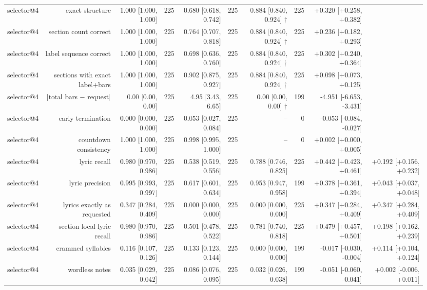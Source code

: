 \begin{table}[t]
\begin{tabular}{lrrrrrrrrr}
selector@4 & exact structure & 1.000 [1.000, 1.000] & 225 & 0.680 [0.618, 0.742] & 225 & 0.884 [0.840, 0.924] † & 225 & +0.320 [+0.258, +0.382] &  \\
selector@4 & section count correct & 1.000 [1.000, 1.000] & 225 & 0.764 [0.707, 0.818] & 225 & 0.884 [0.840, 0.924] † & 225 & +0.236 [+0.182, +0.293] &  \\
selector@4 & label sequence correct & 1.000 [1.000, 1.000] & 225 & 0.698 [0.636, 0.760] & 225 & 0.884 [0.840, 0.924] † & 225 & +0.302 [+0.240, +0.364] &  \\
selector@4 & sections with exact label+bars & 1.000 [1.000, 1.000] & 225 & 0.902 [0.875, 0.927] & 225 & 0.884 [0.840, 0.924] † & 225 & +0.098 [+0.073, +0.125] &  \\
selector@4 & |total bars $-$ request| & 0.00 [0.00, 0.00] & 225 & 4.95 [3.43, 6.65] & 225 & 0.00 [0.00, 0.00] † & 199 & -4.951 [-6.653, -3.431] &  \\
selector@4 & early termination & 0.000 [0.000, 0.000] & 225 & 0.053 [0.027, 0.084] & 225 & – & 0 & -0.053 [-0.084, -0.027] &  \\
selector@4 & countdown consistency & 1.000 [1.000, 1.000] & 225 & 0.998 [0.995, 1.000] & 225 & – & 0 & +0.002 [+0.000, +0.005] &  \\
selector@4 & lyric recall & 0.980 [0.970, 0.986] & 225 & 0.538 [0.519, 0.556] & 225 & 0.788 [0.746, 0.825] & 225 & +0.442 [+0.423, +0.461] & +0.192 [+0.156, +0.232] \\
selector@4 & lyric precision & 0.995 [0.993, 0.997] & 225 & 0.617 [0.601, 0.634] & 225 & 0.953 [0.947, 0.958] & 199 & +0.378 [+0.361, +0.394] & +0.043 [+0.037, +0.048] \\
selector@4 & lyrics exactly as requested & 0.347 [0.284, 0.409] & 225 & 0.000 [0.000, 0.000] & 225 & 0.000 [0.000, 0.000] & 225 & +0.347 [+0.284, +0.409] & +0.347 [+0.284, +0.409] \\
selector@4 & section-local lyric recall & 0.980 [0.970, 0.986] & 225 & 0.501 [0.478, 0.522] & 225 & 0.781 [0.740, 0.818] & 225 & +0.479 [+0.457, +0.501] & +0.198 [+0.162, +0.239] \\
selector@4 & crammed syllables & 0.116 [0.107, 0.126] & 225 & 0.133 [0.123, 0.144] & 225 & 0.000 [0.000, 0.000] & 199 & -0.017 [-0.030, -0.004] & +0.114 [+0.104, +0.124] \\
selector@4 & wordless notes & 0.035 [0.029, 0.042] & 225 & 0.086 [0.076, 0.095] & 225 & 0.032 [0.026, 0.038] & 199 & -0.051 [-0.060, -0.041] & +0.002 [-0.006, +0.011] \\

\end{tabular}
\end{table}
